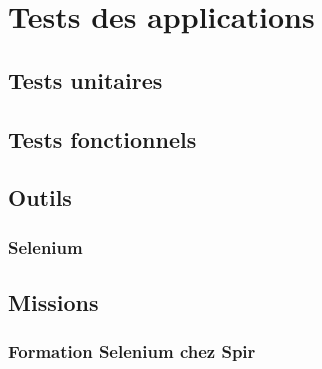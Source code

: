 \section{Tests des applications}

\subsection{Tests unitaires}

\subsection{Tests fonctionnels}

\subsection{Outils}

\subsubsection{Selenium}

\subsection{Missions}

\subsubsection{Formation Selenium chez Spir}

